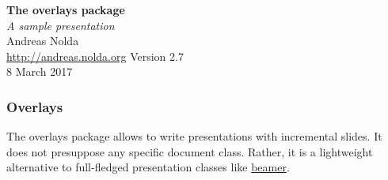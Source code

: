 \documentclass[fontsize=9pt,landscape,parskip=half]{scrartcl}
\begin{document}
\pagestyle{scrheadings}
\raggedright

\thispagestyle{empty}
\label{titlepage}
{\color{structure}%
{\Large \textbf{The \textrm{overlays} package} \\
\textit{A sample presentation}} \\[\baselineskip]
Andreas Nolda \\
\url{http://andreas.nolda.org}}\vfill
{\small Version 2.7 \\
8 March 2017}
\clearpage

\begin{fragileoverlays}{6}
\subsubsection*{Overlays}
The \textrm{overlays} package allows to write presentations with incremental
slides. It does not presuppose any specific document class. Rather, it is a
lightweight alternative to full-fledged presentation classes like
\href{http://www.ctan.org/pkg/beamer}{\textrm{beamer}}.


\begin{quote}
\begin{alltt}
\end{alltt}
\end{quote}

\end{fragileoverlays}
\clearpage

\end{document}
